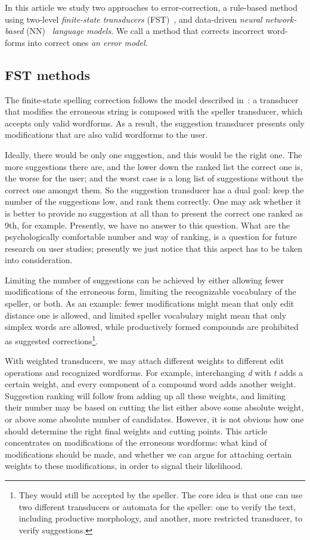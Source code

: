 \documentclass{flammie}
\begin{document}
In this article we study two approaches to error-correction, a rule-based method
using two-level \textit{finite-state transducers}
(FST)~\cite{pirinen2014state}, and data-driven \textit{neural network-based}
(NN)~\cite{hochreiter1997long,bollmann-sogaard-2016-improving} \textit{language
models}. We call a method that corrects incorrect word-forms into correct ones
\textit{an error model}.

\subsection{FST methods}

The finite-state spelling correction follows the model described
in~\cite{pirinen2012}: a transducer that modifies the erroneous string is
composed with the speller transducer, which accepts only valid wordforms. As a
result, the suggestion transducer presents only modifications that are also
valid wordforms to the user.

Ideally, there would be only one suggestion, and this would be the right one.
The more suggestions there are, and the lower down the ranked list the correct
one is, the worse for the user; and the worst case is a long list of suggestions
without the correct one amongst them. So the suggestion transducer has a dual
goal: keep the number of the suggestions low, and rank them correctly. One may
ask whether it is better to provide no suggestion at all than to present the
correct one ranked as 9th, for example. Presently, we have no answer to this
question. What are the psychologically comfortable number and way of ranking, is
a question for future research on user studies; presently we just notice that
this aspect has to be taken into consideration.

Limiting the number of suggestions can be achieved by either allowing fewer
modifications of the erroneous form, limiting the recognizable vocabulary of the
speller, or both. As an example: fewer modifications might mean that only edit
distance one is allowed, and limited speller vocabulary might mean that only
simplex words are allowed, while productively formed compounds are prohibited as
suggested corrections\footnote{They would still be accepted by the speller. The
core idea is that one can use two different transducers or automata for the
speller: one to verify the text, including productive morphology, and another,
more restricted transducer, to verify suggestions.}.

With weighted transducers, we may attach different weights to different edit
operations and recognized wordforms. For example, interchanging \textit{d} with
\textit{t} adds a certain weight, and every component of a compound word adds
another weight. Suggestion ranking will follow from adding up all these weights,
and limiting their number may be based on cutting the list either above some
absolute weight, or above some absolute number of candidates. However, it is not
obvious how one should determine the right final weights and cutting points.
This article concentrates on modifications of the erroneous wordforms: what kind
of modifications should be made, and whether we can argue for attaching certain
weights to these modifications, in order to signal their likelihood.
\end{document}
